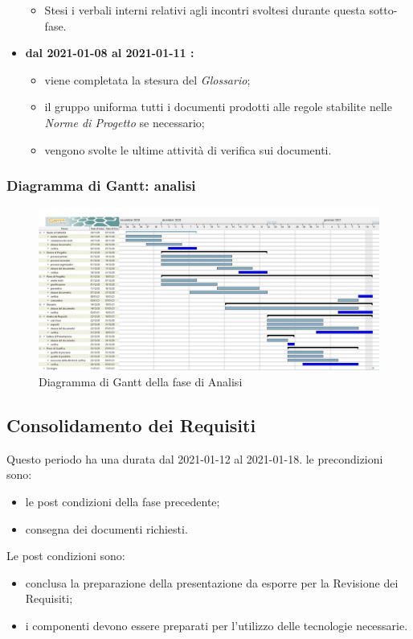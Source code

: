\begin{itemize}
\begin{itemize}
		\item Stesi i verbali interni relativi agli incontri svoltesi durante questa sotto-fase.
	\end{itemize}
	\item \textbf{dal 2021-01-08 al 2021-01-11 :}
	\begin{itemize}
		\item viene completata la stesura del \textit{Glossario};
		\item il gruppo uniforma tutti i documenti prodotti alle regole stabilite nelle \textit{Norme di Progetto} se necessario;
		\item vengono svolte le ultime attività di verifica sui documenti.
	\end{itemize}
\end{itemize}

\subsubsection{Diagramma di Gantt: analisi}
\begin{figure}[H]
    \centering
    \includegraphics[scale = 0.25]{components/img/Analisi.jpg}
    \caption{Diagramma di Gantt della fase di Analisi}
    \label{fig:Diagramma di Gantt, fase di Analisi}
\end{figure}

\newpage
\subsection{Consolidamento dei Requisiti}
Questo periodo ha una durata dal 2021-01-12 al 2021-01-18.
le precondizioni sono:
\begin{itemize}
	\item le post condizioni della fase precedente;
	\item consegna dei documenti richiesti.
\end{itemize}
Le post condizioni sono:
\begin{itemize}
	\item conclusa la preparazione della presentazione da esporre per la Revisione dei Requisiti;
	\item i componenti devono essere preparati per l'utilizzo delle tecnologie necessarie.
\end{itemize}
